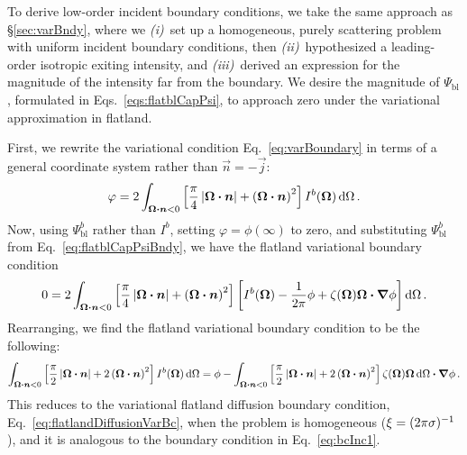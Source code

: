 To derive low-order incident boundary conditions, we take the same approach as
\S\ref{sec:varBndy}, where we \textsl{(i)}~set up a homogeneous,
purely scattering problem with uniform incident boundary conditions, then
\textsl{(ii)}~hypothesized a leading-order isotropic exiting intensity, and
\textsl{(iii)}~derived an expression for the magnitude of the intensity far from
the boundary. We desire the magnitude of $\Psi_\mathrm{bl}$, formulated in 
Eqs.~\eqref{eqs:flatblCapPsi}, to approach zero under the variational
approximation in flatland.

First, we rewrite the variational condition Eq.~\eqref{eq:varBoundary} in terms
of a general coordinate system rather than $\vec{n}=-\vec{j}$:
\begin{equation}\label{eq:varBoundaryGeneral}
  \varphi = 2 \int_{\bm{\Omega}\bm{\cdot} \bm{n} < 0}
  \left[ \frac{\pi}{4} \left| \bm{\Omega}\bm{\cdot} \bm{n} \right| + \left( \bm{\Omega}\bm{\cdot} \bm{n}
  \right)^2 \right] I^b(\bm{\Omega})
  \mathop{}\!\mathrm{d} \Omega\,.
\end{equation}
Now, using $\Psi_\mathrm{bl}^b$ rather than $I^b$,
setting $\varphi=\phi(\infty)$ to zero, and substituting $\Psi_\mathrm{bl}^b$ from
Eq.~\eqref{eq:flatblCapPsiBndy}, we have the flatland variational boundary
condition
\begin{equation*}%
  0 = 2 \int_{\vec{\Omega}\vd \vec{n} < 0}
  \left[ \frac{\pi}{4} \abs{\vec{\Omega}\vd \vec{n}}
  + \left( \vec{\Omega}\vd \vec{n}
  \right)^2 \right]
  \left[ I^b(\vec{\Omega}) - \frac{1}{2\pi} \phi
  + \zeta(\vec{\Omega}) \vec{\Omega}\vd \grad \phi \right]
  \ud \Omega\,.
\end{equation*}
Rearranging, we find the flatland variational boundary condition to be the
following:
\begin{equation}\label{eq:flatBcInc1}
  \int_{\bm{\Omega}\bm{\cdot} \bm{n} < 0}
  \left[ \frac{\pi}{2} \left| \bm{\Omega}\bm{\cdot} \bm{n} \right|
  + 2\left( \bm{\Omega}\bm{\cdot} \bm{n}
  \right)^2 \right] I^b(\bm{\Omega}) \mathop{}\!\mathrm{d} \Omega
  =
  \phi
  -
  \int_{\bm{\Omega}\bm{\cdot} \bm{n} < 0}
  \left[ \frac{\pi}{2} \left| \bm{\Omega}\bm{\cdot} \bm{n} \right|
  + 2\left( \bm{\Omega}\bm{\cdot} \bm{n} \right)^2 \right]
  \zeta(\bm{\Omega}) \bm{\Omega} \mathop{}\!\mathrm{d} \Omega \bm{\cdot} \bm{\nabla} \phi
  \,.
\end{equation}
This reduces to the variational flatland diffusion boundary
condition, Eq.~\eqref{eq:flatlandDiffusionVarBc}, when the problem is
homogeneous ($\xi=(2\pi\sigma)^{-1}$), and it is analogous to the boundary
condition in Eq.~\eqref{eq:bcInc1}.

